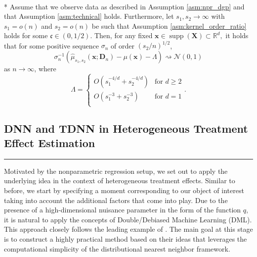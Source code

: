 \begin{boxD}
\begin{thm}\label{thm:dem3}\mbox{}\\*
	Assume that we observe data as described in Assumption \ref{asm:npr_dgp} and that Assumption \ref{asm:technical} holds.
	Furthermore, let $s_1, s_2 \rightarrow \infty$ with $s_1 = o(n)$ and $s_2 = o(n)$ be such that Assumption \ref{asm:kernel_order_ratio} holds for some $\mathfrak{c} \in (0, 1/2)$.
	Then, for any fixed $\mathbf{x} \in \operatorname{supp}(\mathbf{X}) \subset \mathbb{R}^d,$ it holds that for some positive sequence $\sigma_n$ of order $(s_2/n)^{1/2}$,
	\begin{equation}
		\sigma_n^{-1} \left(\hat{\mu}_{s_1, s_2}\left(\mathbf{x}; \mathbf{D}_n\right) - \mu(\mathbf{x}) - \Lambda\right) \rightsquigarrow \mathcal{N}(0,1)
	\end{equation}
	as $n \rightarrow \infty$, where
	\begin{equation*}
		\Lambda = \begin{cases}
			O\left(s_1^{-4/d} + s_2^{-4/d}\right) & \text{for } d \geq 2 \\
			O\left(s_1^{-3} + s_2^{-3}\right)     & \text{for } d = 1    \\
		\end{cases}.
	\end{equation*}
\end{thm}
\end{boxD}

\subsection{DNN and TDNN in Heterogeneous Treatment Effect Estimation}
\hrule
Motivated by the nonparametric regression setup, we set out to apply the underlying idea in the context of heterogeneous treatment effects.
Similar to before, we start by specifying a moment corresponding to our object of interest taking into account the additional factors that come into play.
Due to the presence of a high-dimensional nuisance parameter in the form of the function $q$, it is natural to apply the concepts of Double/Debiased Machine Learning (DML).
This approach closely follows the leading example of \citet{ritzwoller_uniform_2024}.
The main goal at this stage is to construct a highly practical method based on their ideas that leverages the computational simplicity of the distributional nearest neighbor framework.\\

